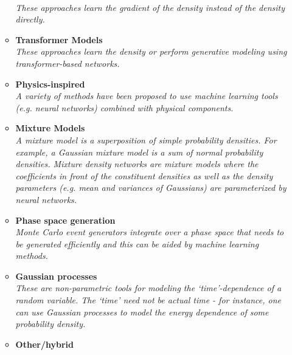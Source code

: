 \documentclass[12pt,letterpaper]{article}
\begin{document}
\begin{itemize}
\begin{itemize}
		\\\textit{These approaches learn the gradient of the density instead of the density directly.}
		\item \textbf{Transformer Models}~\cite{Wang:2024rup,Brehmer:2024yqw,Quetant:2024ftg,Spinner:2024hjm,Paeng:2024ary,Li:2023xhj,Tomiya:2023jdy,Raine:2023fko,Butter:2023fov,Finke:2023veq}
		\\\textit{These approaches learn the density or perform generative modeling using transformer-based networks.}
		\item \textbf{Physics-inspired}~\cite{Abasov:2024hyq,Larkoski:2023xam,Barenboim:2021vzh,Lai:2020byl,1808876,Andreassen:2019txo,Andreassen:2018apy}
		\\\textit{A variety of methods have been proposed to use machine learning tools (e.g. neural networks) combined with physical components.}
		\item \textbf{Mixture Models}~\cite{Vermunt:2023fsr,Liu:2022dem,Jia:2022ulh,Graziani:2021vai,Burton:2021tsd,Chen:2020uds}
		\\\textit{A mixture model is a superposition of simple probability densities.  For example, a Gaussian mixture model is a sum of normal probability densities.  Mixture density networks are mixture models where the coefficients in front of the constituent densities as well as the density parameters (e.g. mean and variances of Gaussians) are parameterized by neural networks.}
		\item \textbf{Phase space generation}~\cite{Baruah:2025nby,Diaz:2024sxg,Ban:2024bqy,Kofler:2024efb,Deutschmann:2024lml,Calisto:2023vmm,Singh:2023yvj,Renteria-Estrada:2023buo,Heimel:2022wyj,Jinno:2022sbr,Maitre:2022xle,Yoon:2020zmb,Danziger:2021eeg,Backes:2020vka,Verheyen:2020bjw,Chen:2020nfb,Nachman:2020fff,Carrazza:2020rdn,Klimek:2018mza,Gao:2020vdv,Gao:2020zvv,Bothmann:2020ywa,Bendavid:2017zhk}
		\\\textit{Monte Carlo event generators integrate over a phase space that needs to be generated efficiently and this can be aided by machine learning methods.}
		\item \textbf{Gaussian processes}~\cite{Cisbani:2019xta,1804325,Bertone:2016mdy,Frate:2017mai}
		\\\textit{These are non-parametric tools for modeling the `time'-dependence of a random variable.  The `time' need not be actual time - for instance, one can use Gaussian processes to model the energy dependence of some probability density.}
		\item \textbf{Other/hybrid}~\cite{Sahu:2023uwb,Santos:2023mib,Kronheim:2023jrl,Butter:2023fov,Kansal:2022spb,Li:2022jon,DiBello:2022rss,Cresswell:2022tof}

\end{itemize}
\end{itemize}
\end{document}
